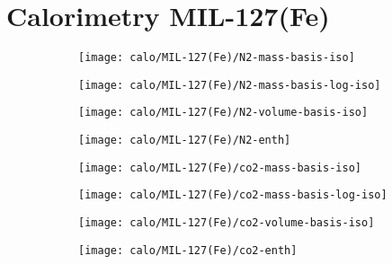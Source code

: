 
\section{Calorimetry MIL-127(Fe)}

\begin{figure}[H]
    \centering

    \begin{subfigure}{0.25\linewidth}
        \texttt{[image: calo/MIL-127(Fe)/N2-mass-basis-iso]}%
        \label{appx:fgr:shaping:mil127n2mass}
    \end{subfigure}%
    \begin{subfigure}{0.25\linewidth}
        \texttt{[image: calo/MIL-127(Fe)/N2-mass-basis-log-iso]}%
        \label{appx:fgr:shaping:mil127n2masslog}
    \end{subfigure}%
    \begin{subfigure}{0.25\linewidth}
        \texttt{[image: calo/MIL-127(Fe)/N2-volume-basis-iso]}%
        \label{appx:fgr:shaping:mil127n2volume}
    \end{subfigure}%
    \begin{subfigure}{0.25\linewidth}
        \texttt{[image: calo/MIL-127(Fe)/N2-enth]}%
        \label{appx:fgr:shaping:mil127n2enth}
    \end{subfigure}%
    
    \begin{subfigure}{0.25\textwidth}
        \texttt{[image: calo/MIL-127(Fe)/co2-mass-basis-iso]}%
        \label{appx:fgr:shaping:mil127co2mass}
    \end{subfigure}%
    \begin{subfigure}{0.25\textwidth}
        \texttt{[image: calo/MIL-127(Fe)/co2-mass-basis-log-iso]}%
        \label{appx:fgr:shaping:mil127co2masslog}
    \end{subfigure}%
    \begin{subfigure}{0.25\textwidth}
        \texttt{[image: calo/MIL-127(Fe)/co2-volume-basis-iso]}%
        \label{appx:fgr:shaping:mil127co2volume}
    \end{subfigure}%
    \begin{subfigure}{0.25\textwidth}
        \texttt{[image: calo/MIL-127(Fe)/co2-enth]}%
        \label{appx:fgr:shaping:mil127co2enth}
    \end{subfigure}%


\end{figure}
